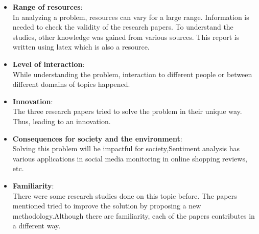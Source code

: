 \documentclass[a4paper,12pt]{article}
\begin{document}
\begin{itemize}
    \item \textbf{Range of resources}:\\
    In analyzing a problem, resources can vary for a large range. Information is needed to check the validity of the research papers. To understand the studies, other knowledge was gained from various sources. This report is written using latex which is also a resource.
    \item \textbf{Level of interaction}:\\
    While understanding the problem, interaction to different people or between different domains of topics happened.

    \item \textbf{Innovation}:\\
    The three research papers tried to solve the problem in their unique way. Thus, leading to an innovation.

    \item \textbf{Consequences for society and the environment}:\\
    Solving this problem will be impactful for society,Sentiment analysis has various applications in social media monitoring in online shopping reviews, etc.
    \item  \textbf{Familiarity}:\\
    There were some research studies done on this topic before. The papers mentioned tried to improve the solution by proposing a new methodology.Although there are familiarity, each of the papers contributes in a different way.
\end{itemize}

\end{document}
